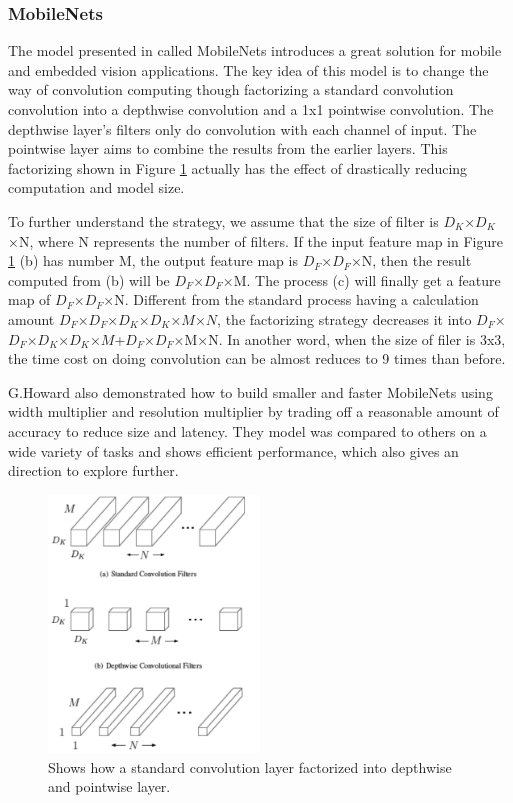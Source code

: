 \documentclass[a4paper]{article}
\begin{document}
\subsubsection{MobileNets}
\par The model presented in \cite{mobilenets} called MobileNets introduces a great solution for mobile and embedded vision applications. The key idea of this model is to change the way of convolution computing though factorizing a standard convolution convolution into a depthwise convolution and a 1x1 pointwise convolution. The depthwise layer's filters only do convolution with each channel of input. The pointwise layer aims to combine the results from the earlier layers. This factorizing shown in Figure \ref{mobile} actually has the effect of drastically reducing computation and model size.
\par To further understand the strategy, we assume that the size of filter is $D_K$×$D_K$×N, where N represents the number of filters. If the input feature map in Figure \ref{mobile} (b) has number M, the output feature map is $D_F$×$D_F$×N, then the result computed from (b) will be $D_F$×$D_F$×M. The process (c) will finally get a feature map of $D_F$×$D_F$×N. Different from the standard process having a calculation amount $D_F$×$D_F$×$D_K$×$D_K$×$M$×$N$, the factorizing strategy decreases it into $D_F$×$D_F$×$D_K$×$D_K$×$M$+$D_F$×$D_F$×M×N. In another word, when the size of filer is 3x3, the time cost on doing convolution can be almost reduces to 9 times than before.
\par G.Howard also demonstrated how to build smaller and faster MobileNets using width multiplier and resolution multiplier by trading off a reasonable amount of accuracy to reduce size and latency. They model was compared to others on a wide variety of tasks and shows efficient performance, which also gives an direction to explore further. 
\begin{figure}
\centering
\includegraphics[width=0.5\textwidth]{mobile.png}
\caption{\label{mobile}Shows how a standard convolution layer factorized into depthwise and pointwise layer.}
\end{figure}
\end{document}
